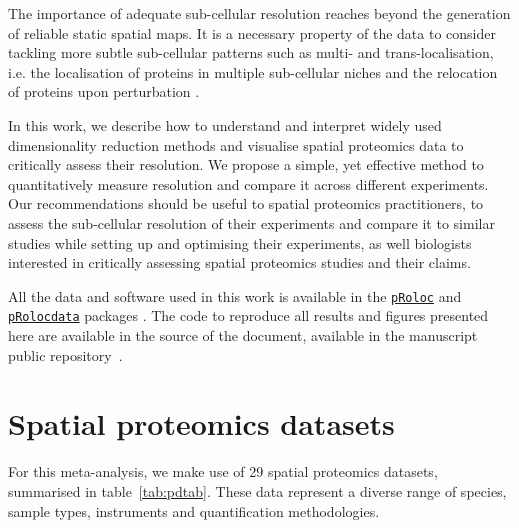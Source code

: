 \documentclass[12pt]{article}\usepackage[]{graphicx}\usepackage[]{color}
\newcommand{\Rpackage}[1]{\texttt{#1}}
\newcommand\Biocpkg[1]{%
  {\href{http://bioconductor.org/packages/#1}%
    {\Rpackage{#1}}}}
\newcommand\Biocexptpkg[1]{\Biocpkg{#1}}
\begin{document}
The importance of adequate sub-cellular resolution reaches beyond the
generation of reliable static spatial maps. It is a necessary property
of the data to consider tackling more subtle sub-cellular patterns
such as multi- and trans-localisation, i.e. the localisation of
proteins in multiple sub-cellular niches and the relocation of
proteins upon perturbation \citep{Gatto:2014}.

\bigskip

In this work, we describe how to understand and interpret widely used
dimensionality reduction methods and visualise spatial
proteomics data to critically assess their resolution. We propose a
simple, yet effective method to quantitatively measure resolution and
compare it across different experiments. Our recommendations should be
useful to spatial proteomics practitioners, to assess the sub-cellular
resolution of their experiments and compare it to similar studies
while setting up and optimising their experiments, as well biologists
interested in critically assessing spatial proteomics studies and
their claims.

All the data and software used in this work is available in the
\Biocpkg{pRoloc} and \Biocexptpkg{pRolocdata} packages
\citep{Gatto:2014a}. The code to reproduce all results and figures
presented here are available in the source of the document, available
in the manuscript public repository~\cite{qseprepo}.

\section{Spatial proteomics datasets}\label{sec:pdata}



For this meta-analysis, we make use of 29 spatial
proteomics datasets, summarised in table~\ref{tab:pdtab}. These data
represent a diverse range of species, sample types, instruments and
quantification methodologies.
\end{document}

